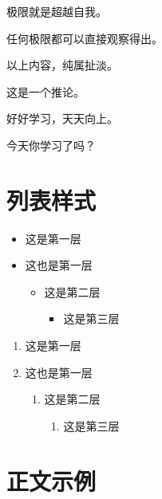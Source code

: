 \documentclass[
  10pt,
  twoside,
  openany,
  b5paper, %
  colorscheme = bootstrap-v4, %
]{qyxf-book}
\begin{document}
\begin{define}
  极限就是超越自我。
\end{define}

\begin{theorem}
  任何极限都可以直接观察得出。
\end{theorem}

\begin{lemma}
  以上内容，纯属扯淡。
\end{lemma}

\begin{corollary}
 这是一个推论。
\end{corollary}

\begin{note}
  好好学习，天天向上。
\end{note}

\begin{alert}
  今天你学习了吗？
\end{alert}

\section{列表样式}
\begin{itemize}
  \item 这是第一层
  \item 这也是第一层
  \begin{itemize}
    \item 这是第二层
    \begin{itemize}
      \item 这是第三层
    \end{itemize}
  \end{itemize}
\end{itemize}

\begin{enumerate}
  \item 这是第一层
  \item 这也是第一层
  \begin{enumerate}
    \item 这是第二层
    \begin{enumerate}
      \item 这是第三层
    \end{enumerate}
  \end{enumerate}
\end{enumerate}

\section{正文示例}
\end{document}
